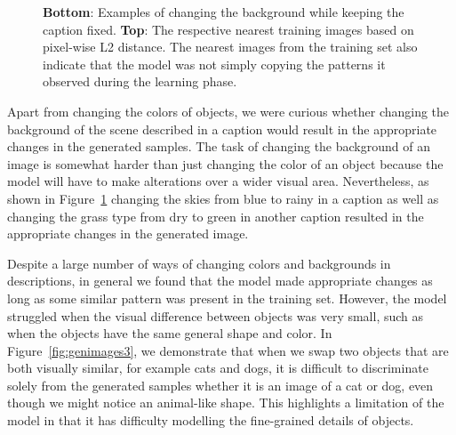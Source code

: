 \documentclass{article} %
\begin{document}
\begin{figure}[!t]
\begin{center}
%
\quad
%
\end{center}
\caption{\textbf{Bottom}: Examples of changing the background while keeping the caption fixed. \textbf{Top}: The respective nearest training images based on pixel-wise L2 distance. The nearest images from the training set also indicate that the model was not simply copying the patterns it observed during the learning phase.}
\label{fig:genimages2}
\vspace{-0.3cm}
\end{figure}

Apart from changing the colors of objects, we were curious whether changing the background of the scene described in a caption would result in the appropriate changes in the generated samples. The task of changing the background of an image is somewhat harder than just changing the color of an object because the model will have to make alterations over a wider visual area. Nevertheless, as shown in Figure~\ref{fig:genimages2} changing the skies from blue to rainy in a caption as well as changing the grass type from dry to green in another caption resulted in the appropriate changes in the generated image.

Despite a large number of ways of changing colors and backgrounds in descriptions, in general we found that the model made appropriate changes as long as some similar pattern was present in the training set. However, the model struggled when the visual difference between objects was very small, such as when the objects have the same general shape and color. In Figure~\ref{fig:genimages3}, we demonstrate that when we swap two objects that are both visually similar, for example cats and dogs, it is difficult to discriminate solely from the generated samples whether it is an image of a cat or dog, even though we might notice an animal-like shape. This highlights a limitation of the model in that it has difficulty modelling the fine-grained details of objects. 
 
\end{document}
